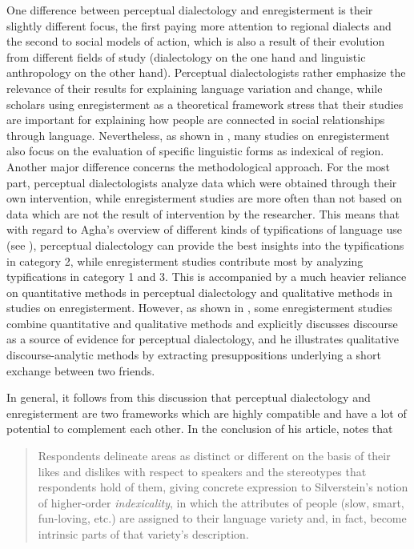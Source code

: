 One difference between perceptual dialectology and enregisterment is their slightly different focus, the first paying more attention to regional dialects and the second to social models of action, which is also a result of their evolution from different fields of study (dialectology on the one hand and linguistic anthropology on the other hand). Perceptual dialectologists rather emphasize the relevance of their results for explaining language variation and change, while scholars using enregisterment as a theoretical framework stress that their studies are important for explaining how people are connected in social relationships through language. Nevertheless, as shown in , many studies on enregisterment also focus on the evaluation of specific linguistic forms as indexical of region. Another major difference concerns the methodological approach. For the most part, perceptual dialectologists analyze data which were obtained through their own intervention, while enregisterment studies are more often than not based on data which are not the result of intervention by the researcher. This means that with regard to Agha’s overview of different kinds of typifications of language use (see ), perceptual dialectology can provide the best insights into the typifications in category 2, while enregisterment studies contribute most by analyzing typifications in category 1 and 3. This is accompanied by a much heavier reliance on quantitative methods in perceptual dialectology and qualitative methods in studies on enregisterment. However, as shown in , some enregisterment studies combine quantitative and qualitative methods and \citet[194]{Preston2018} explicitly discusses discourse as a source of evidence for perceptual dialectology, and he illustrates qualitative discourse-analytic methods by extracting presuppositions underlying a short exchange between two friends.

In general, it follows from this discussion that perceptual dialectology and enregisterment are two frameworks which are highly compatible and have a lot of potential to complement each other. In the conclusion of his article, \citet[200]{Preston2018} notes that

\begin{quote}
Respondents delineate areas as distinct or different on the basis of their likes and dislikes with respect to speakers and the stereotypes that respondents hold of them, giving concrete expression to Silverstein’s notion of higher-order \emph{indexicality}, in which the attributes of people (slow, smart, fun-loving, etc.) are assigned to their language variety and, in fact, become intrinsic parts of that variety’s description.
\end{quote}


